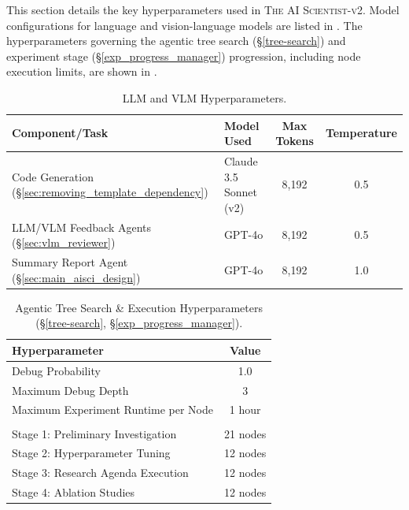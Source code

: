 \documentclass[11pt, a4paper]{include/gdm_format}
\newcommand{\ouralgo}{\textsc{The AI Scientist-v2}\xspace}
\begin{document}
This section details the key hyperparameters used in \ouralgo. Model configurations for language and vision-language models are listed in . The hyperparameters governing the agentic tree search (\S\ref{tree-search}) and experiment stage (\S\ref{exp_progress_manager}) progression, including node execution limits, are shown in .

\begin{table}[htbp]
    \centering
    \caption{LLM and VLM Hyperparameters.}
    \label{tab:model_hypers}
    \begin{tabular}{@{}llcc@{}}
        \toprule
        Component/Task & Model Used & Max Tokens & Temperature \\
        \midrule
        Code Generation (\S\ref{sec:removing_template_dependency}) & Claude 3.5 Sonnet (v2) & 8,192 & 0.5 \\
        LLM/VLM Feedback Agents (\S\ref{sec:vlm_reviewer}) & GPT-4o & 8,192 & 0.5 \\
        Summary Report Agent (\S\ref{sec:main_aisci_design}) & GPT-4o & 8,192 & 1.0 \\
        \bottomrule
    \end{tabular}
\end{table}

\begin{table}[htbp]
    \centering
    \caption{Agentic Tree Search \& Execution Hyperparameters (\S\ref{tree-search}, \S\ref{exp_progress_manager}).}
    \label{tab:tree_search_hypers}
    \begin{tabular}{@{}lc@{}}
        \toprule
        Hyperparameter & Value \\
        \midrule
        Debug Probability & 1.0 \\
        Maximum Debug Depth & 3 \\
        Maximum Experiment Runtime per Node & 1 hour \\
        \addlinespace[0.5em]
        \multicolumn{2}{l}{\textit{Node Allocation per Stage:}} \\
        Stage 1: Preliminary Investigation & 21 nodes \\
        Stage 2: Hyperparameter Tuning & 12 nodes \\
        Stage 3: Research Agenda Execution & 12 nodes \\
        Stage 4: Ablation Studies & 12 nodes \\
        \bottomrule
    \end{tabular}
\end{table}
\end{document}
